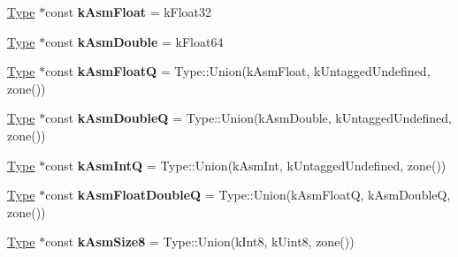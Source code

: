 \begin{DoxyCompactItemize}
\item 
\hyperlink{classv8_1_1internal_1_1_type}{Type} $\ast$const {\bfseries k\+Asm\+Float} = k\+Float32\hypertarget{classv8_1_1internal_1_1_type_cache_a083f876e2963be00864798202000144d}{}\label{classv8_1_1internal_1_1_type_cache_a083f876e2963be00864798202000144d}

\item 
\hyperlink{classv8_1_1internal_1_1_type}{Type} $\ast$const {\bfseries k\+Asm\+Double} = k\+Float64\hypertarget{classv8_1_1internal_1_1_type_cache_ac69bbb57419cf9784466083804c3f19c}{}\label{classv8_1_1internal_1_1_type_cache_ac69bbb57419cf9784466083804c3f19c}

\item 
\hyperlink{classv8_1_1internal_1_1_type}{Type} $\ast$const {\bfseries k\+Asm\+FloatQ} = Type\+::\+Union(k\+Asm\+Float, k\+Untagged\+Undefined, zone())\hypertarget{classv8_1_1internal_1_1_type_cache_ad8163476aaf718d766a694c72f05d0cf}{}\label{classv8_1_1internal_1_1_type_cache_ad8163476aaf718d766a694c72f05d0cf}

\item 
\hyperlink{classv8_1_1internal_1_1_type}{Type} $\ast$const {\bfseries k\+Asm\+DoubleQ} = Type\+::\+Union(k\+Asm\+Double, k\+Untagged\+Undefined, zone())\hypertarget{classv8_1_1internal_1_1_type_cache_aceb97f1402ff0afc0c92690f66d0dd26}{}\label{classv8_1_1internal_1_1_type_cache_aceb97f1402ff0afc0c92690f66d0dd26}

\item 
\hyperlink{classv8_1_1internal_1_1_type}{Type} $\ast$const {\bfseries k\+Asm\+IntQ} = Type\+::\+Union(k\+Asm\+Int, k\+Untagged\+Undefined, zone())\hypertarget{classv8_1_1internal_1_1_type_cache_a6c577a0a4e69c0522c7f1ff665568c41}{}\label{classv8_1_1internal_1_1_type_cache_a6c577a0a4e69c0522c7f1ff665568c41}

\item 
\hyperlink{classv8_1_1internal_1_1_type}{Type} $\ast$const {\bfseries k\+Asm\+Float\+DoubleQ} = Type\+::\+Union(k\+Asm\+FloatQ, k\+Asm\+DoubleQ, zone())\hypertarget{classv8_1_1internal_1_1_type_cache_acce1b6e6d79acbff37986f60c3683de0}{}\label{classv8_1_1internal_1_1_type_cache_acce1b6e6d79acbff37986f60c3683de0}

\item 
\hyperlink{classv8_1_1internal_1_1_type}{Type} $\ast$const {\bfseries k\+Asm\+Size8} = Type\+::\+Union(k\+Int8, k\+Uint8, zone())\hypertarget{classv8_1_1internal_1_1_type_cache_a96aff5d5a51daef878b9eeb8fd125237}{}\label{classv8_1_1internal_1_1_type_cache_a96aff5d5a51daef878b9eeb8fd125237}


\end{DoxyCompactItemize}
